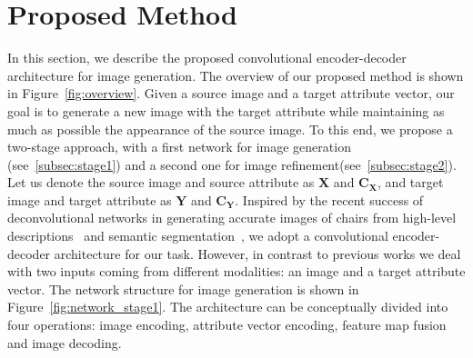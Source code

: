 \documentclass[10pt,twocolumn,letterpaper]{article}
\begin{document}
\section{Proposed Method}
\label{sec:method}
In this section, we describe the proposed convolutional encoder-decoder architecture for image generation. The overview of our proposed method is shown in Figure~\ref{fig:overview}.
Given a source image and a target attribute vector, our goal is to generate a new image with the target attribute while maintaining as much as possible the appearance of the source image. To this end, we propose a two-stage approach, with a first network for image generation (see~\ref{subsec:stage1}) and a second one for image refinement(see~\ref{subsec:stage2}).
Let us denote the source image and source attribute as $\mathbf{X}$ and $\mathbf{C_X}$, and target image and target attribute as $\mathbf{Y}$ and $\mathbf{C_Y}$. 
Inspired by the recent success of deconvolutional networks in generating accurate images of chairs 
from high-level descriptions~\cite{Dosovitskiy-cvpr15} and semantic segmentation~\cite{Long-cvpr15,Noh-iccv15}, 
we adopt a convolutional encoder-decoder architecture for our task. 
However, in contrast to previous works we deal with two inputs coming from different modalities: 
an image and a target attribute vector.
The network structure for image generation is shown in Figure~\ref{fig:network_stage1}.
The architecture can be conceptually divided into four operations:
image encoding, attribute vector encoding, feature map fusion and image decoding.
\end{document}
